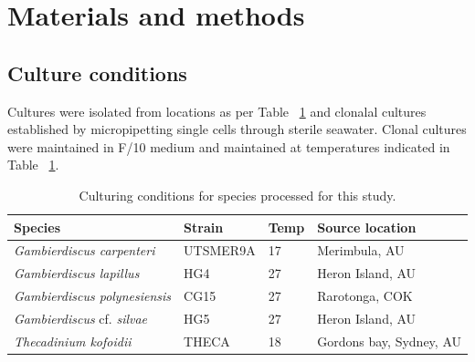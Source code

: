 \documentclass[12pt]{article}
\begin{document}
\newpage

\section{Materials and methods}
\subsection*{Culture conditions}
\FloatBarrier
Cultures were isolated from locations as per Table ~\ref{tbl:strainTable} and clonalal cultures established by micropipetting single cells through sterile seawater. Clonal cultures were maintained in F/10 medium and maintained at temperatures indicated in Table ~\ref{tbl:strainTable}.

\begin{table}
\caption{Culturing conditions for species processed for this study.}
\label{tbl:strainTable}
\begin{tabular}{ | p{3cm} | p{2.5cm} | p{1.5cm} | p{5.3cm} |}
\hline
\textbf{Species} & \textbf{Strain}& \textbf{Temp} & \textbf{Source location} \\
\hline
\textit{Gambierdiscus carpenteri}&UTSMER9A&17&Merimbula, AU\\
\hline
\textit{Gambierdiscus lapillus}&HG4&27&Heron Island, AU\\
\hline
\textit{Gambierdiscus polynesiensis}&CG15&27&Rarotonga, COK\\
\hline
\textit{Gambierdiscus} cf. \textit{silvae}&HG5&27&Heron Island, AU\\
\hline
\textit{Thecadinium kofoidii}&THECA&18&Gordons bay, Sydney, AU\\
\hline
\end{tabular}
\end{table}
\FloatBarrier
\end{document}
